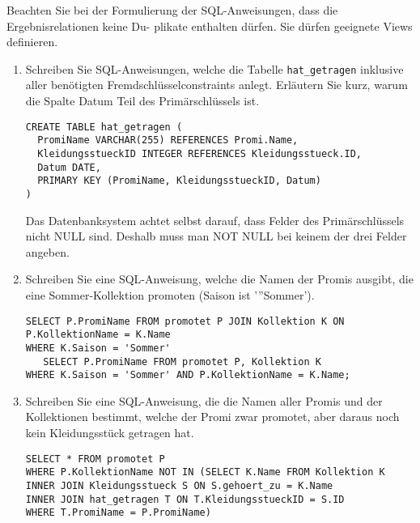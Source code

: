\documentclass{lehramt-informatik-aufgabe}
\begin{document}
Beachten Sie bei der Formulierung der SQL-Anweisungen, dass die
Ergebnisrelationen keine Du- plikate enthalten dürfen. Sie dürfen
geeignete Views definieren.
\begin{enumerate}


\item Schreiben Sie SQL-Anweisungen, welche die Tabelle \texttt{hat\_getragen}
inklusive aller benötigten Fremdschlüsselconstraints anlegt. Erläutern
Sie kurz, warum die Spalte Datum Teil des Primärschlüssels ist.

\begin{liAntwort}
\begin{verbatim}
CREATE TABLE hat_getragen (
  PromiName VARCHAR(255) REFERENCES Promi.Name,
  KleidungsstueckID INTEGER REFERENCES Kleidungsstueck.ID,
  Datum DATE,
  PRIMARY KEY (PromiName, KleidungsstueckID, Datum)
)
\end{verbatim}

Das Datenbanksystem achtet selbst darauf, dass Felder des
Primärschlüssels nicht NULL sind. Deshalb muss man NOT NULL bei keinem
der drei Felder angeben.
\end{liAntwort}


\item Schreiben Sie eine SQL-Anweisung, welche die Namen der Promis
ausgibt, die eine Sommer-Kollektion promoten (Saison ist ’”Sommer’).

\begin{liAntwort}
\begin{verbatim}
SELECT P.PromiName FROM promotet P JOIN Kollektion K ON
P.KollektionName = K.Name
WHERE K.Saison = 'Sommer'
   SELECT P.PromiName FROM promotet P, Kollektion K
WHERE K.Saison = 'Sommer' AND P.KollektionName = K.Name;
\end{verbatim}
\end{liAntwort}


\item Schreiben Sie eine SQL-Anweisung, die die Namen aller Promis und
der Kollektionen bestimmt, welche der Promi zwar promotet, aber daraus
noch kein Kleidungsstück getragen hat.

\begin{liAntwort}
\begin{verbatim}
SELECT * FROM promotet P
WHERE P.KollektionName NOT IN (SELECT K.Name FROM Kollektion K
INNER JOIN Kleidungsstueck S ON S.gehoert_zu = K.Name
INNER JOIN hat_getragen T ON T.KleidungsstueckID = S.ID
WHERE T.PromiName = P.PromiName)
\end{verbatim}


\end{liAntwort}
\end{enumerate}
\end{document}
